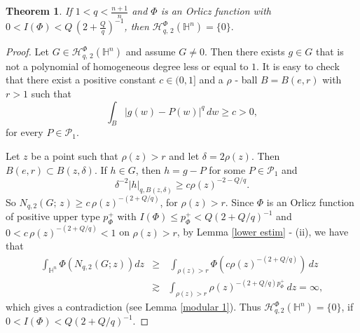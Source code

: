 \documentclass[oneside,10pt]{article}
\newtheorem{theorem}{Theorem}
\begin{document}
\begin{theorem} \label{2nd thm}
If $1 < q < \frac{n+1}{n}$ and $\Phi$ is an Orlicz function with $0 < I(\Phi) < Q \, (2 + \frac{Q}{q})^{-1}$, then 
$\mathcal{H}^{\Phi}_{q, \, 2}(\mathbb{H}^{n}) = \{ 0 \}.$
\end{theorem}

\begin{proof} Let $G \in \mathcal{H}^{\Phi}_{q, \, 2}(\mathbb{H}^{n})$ and assume $G \neq 0$. Then there exists $g \in G$ 
that is not a polynomial of homogeneous degree less or equal to $1$. It is easy to check that there exist a positive constant 
$c \in (0, 1]$ and a $\rho$ - ball $B = B(e, r)$ with $r > 1$ such that
\[
\int_{B} |g(w) - P(w)|^{q} \, dw \geq c > 0,
\]
for every $P \in \mathcal{P}_{1}$.

Let $z$ be a point such that $\rho(z) > r$ and let $\delta = 2 \rho(z)$. Then $B(e, r) \subset B(z, \delta)$. If $h \in G$, then 
$h = g - P$ for some $P \in \mathcal{P}_{1}$ and
\[
\delta^{-2}|h|_{q, B(z, \delta)} \geq c \rho(z)^{-2-Q/q}.
\]
So $N_{q,2}(G; \, z) \geq c \, \rho(z)^{-(2+Q/q)}$, for $\rho(z) > r$. Since $\Phi$ is an Orlicz function of positive upper type 
$p_{\Phi}^{+}$ with $I(\Phi) \leq p_{\Phi}^{+} < Q(2+Q/q)^{-1}$ and $0 < c \, \rho(z)^{-(2+Q/q)} < 1$ on $\rho(z) > r$, by 
Lemma \ref{lower estim} - (ii), we have that
\begin{eqnarray*}
\int_{\mathbb{H}^n} \Phi\left( N_{q,2}(G; z) \right) dz &\geq& \, \int_{\rho(z) > r} \Phi\left( c \rho(z)^{-(2+Q/q)} \right) \, dz \\
&\gtrsim& \int_{\rho(z) > r} \rho(z)^{-(2+Q/q)p^{+}_{\Phi}} \, dz = \infty,
\end{eqnarray*}
which gives a contradiction (see Lemma \ref{modular 1}). Thus $\mathcal{H}^{\Phi}_{q, 2}(\mathbb{H}^{n}) = \{0\}$, 
if $0 < I(\Phi) < Q(2+Q/q)^{-1}$.
\end{proof}
\end{document}
